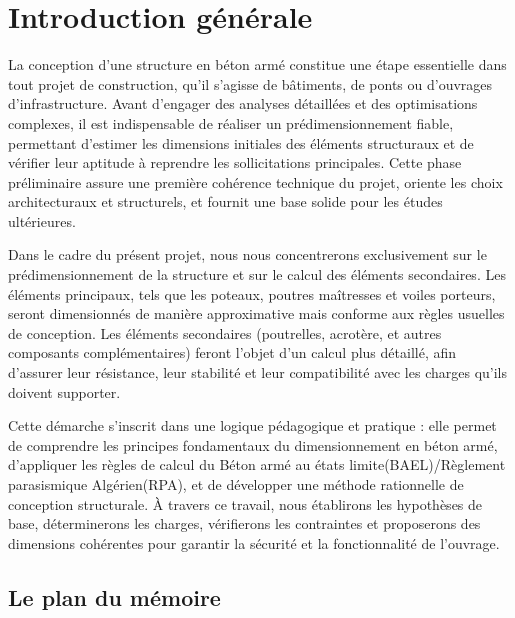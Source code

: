 \documentclass[12pt,a4paper]{report}
\numberwithin{equation}{section}
\begin{document}
	
	
	
	
	\chapter*{Introduction générale}
	
	La conception d’une structure en béton armé constitue une étape essentielle dans tout projet de construction, qu’il s’agisse de bâtiments, de ponts ou d’ouvrages d’infrastructure. Avant d’engager des analyses détaillées et des optimisations complexes, il est indispensable de réaliser un prédimensionnement fiable, permettant d’estimer les dimensions initiales des éléments structuraux et de vérifier leur aptitude à reprendre les sollicitations principales. Cette phase préliminaire assure une première cohérence technique du projet, oriente les choix architecturaux et structurels, et fournit une base solide pour les études ultérieures.
	
	\vspace{.7\baselineskip}
	
	Dans le cadre du présent projet, nous nous concentrerons exclusivement sur le prédimensionnement de la structure et sur le calcul des éléments secondaires. Les éléments principaux, tels que les poteaux, poutres maîtresses et voiles porteurs, seront dimensionnés de manière approximative mais conforme aux règles usuelles de conception. Les éléments secondaires (poutrelles, acrotère, et autres composants complémentaires) feront l’objet d’un calcul plus détaillé, afin d’assurer leur résistance, leur stabilité et leur compatibilité avec les charges qu’ils doivent supporter.
	
	\vspace{.7\baselineskip}
	
	Cette démarche s’inscrit dans une logique pédagogique et pratique : elle permet de comprendre les principes fondamentaux du dimensionnement en béton armé, d’appliquer les règles de calcul du Béton armé au états limite(BAEL)/Règlement parasismique Algérien(RPA), et de développer une méthode rationnelle de conception structurale. À travers ce travail, nous établirons les hypothèses de base, déterminerons les charges, vérifierons les contraintes et proposerons des dimensions cohérentes pour garantir la sécurité et la fonctionnalité de l’ouvrage.
	
	\section*{Le plan du mémoire}
	
\end{document}
